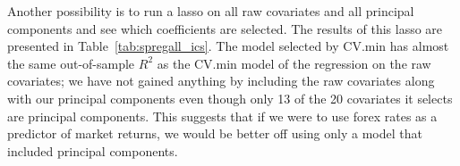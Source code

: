 \documentclass[11pt, fleqn]{article}
\begin{document}


Another possibility is to run a lasso on all raw covariates and all principal components and see which coefficients are selected. The results of this lasso are presented in Table~\ref{tab:spregall_ics}. The model selected by CV.min has almost the same out-of-sample $R^2$ as the CV.min model of the regression on the raw covariates; we have not gained anything by including the raw covariates along with our principal components even though only 13 of the 20 covariates it selects are principal components. This suggests that if we were to use forex rates as a predictor of market returns, we would be better off using only a model that included principal components.


\end{document}
